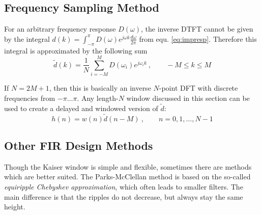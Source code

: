 \subsection{Frequency Sampling Method}
For an arbitrary frequency response $D(\omega)$, the inverse DTFT cannot
be given by the integral 
$d(k) = \int_{-\pi}^{\pi}D(\omega) e^{j\omega k}\frac{d\omega}{2\pi}$ 
from equ. \ref{eq:impresp}. Therefore this integral is approximated by the
following sum
\begin{equation*}
	\tilde{d}(k) = \frac{1}{N} \sum\limits_{i=-M}^M D(\omega_i) e^{j \omega_i k} \:, \qquad -M \leq k \leq M
\end{equation*}

If $N = 2M+1$, then this is basically an inverse $N$-point DFT with discrete
frequencies from $-\pi \ldots \pi$. Any length-$N$ window discussed in this
section can be used to create a delayed and windowed version of $\tilde{d}$:
\begin{equation*}
	h(n) = w(n) \tilde{d}(n-M) \:, \qquad n = 0,1,\ldots,N-1
\end{equation*}

\subsection{Other FIR Design Methods}
Though the Kaiser window is simple and flexible, sometimes there are methods
which are better suited. The Parks-McClellan method is based on the so-called
\emph{equiripple Chebyshev approximation}, which often leads to smaller filters.
The main difference is that the ripples do not decrease, but always stay the
same height.
